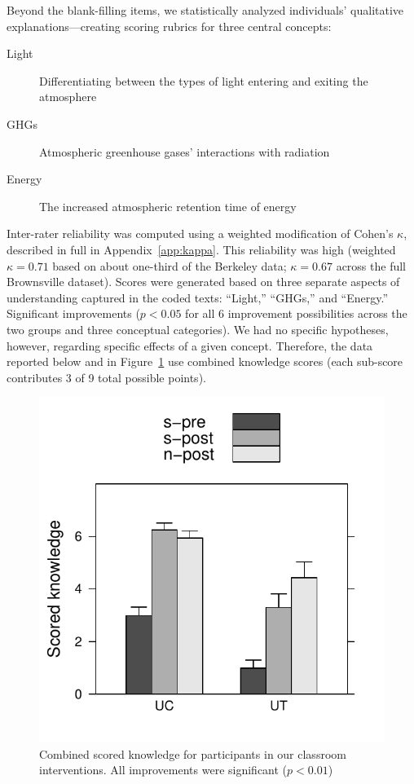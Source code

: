 Beyond the blank-filling items, we statistically analyzed individuals’
qualitative explanations—creating scoring rubrics for three central concepts:
\begin{description}
    \item[Light] Differentiating between the types of light entering and exiting the
atmosphere 
    \item[GHGs] Atmospheric greenhouse gases’ interactions with radiation
    \item[Energy] The increased atmospheric retention time of energy
\end{description}
Inter-rater reliability
was computed using a weighted modification of Cohen's $\kappa$, described in
full in Appendix~\ref{app:kappa}. This reliability was high (weighted $κ = 0.71$
based on about one-third of the Berkeley data; $κ = 0.67$ across the full
Brownsville dataset). Scores were generated based on three separate aspects of
understanding captured in the coded texts: “Light,” “GHGs,” and “Energy.”
Significant improvements ($p < 0.05$ for all 6 improvement possibilities across
the two groups and three conceptual categories). We had no specific hypotheses,
however, regarding specific effects of a given concept. Therefore, the data
reported below and in Figure~\ref{fig:class-scored-knowledge} use combined
knowledge scores (each sub-score contributes 3 of 9 total possible points).

\begin{figure}
    \centering
    \includegraphics{class-scored-knowledge.pdf}
    \caption{Combined scored knowledge for participants in our classroom
        interventions. All improvements were significant ($p < 0.01$)}
    \label{fig:class-scored-knowledge}
\end{figure}


